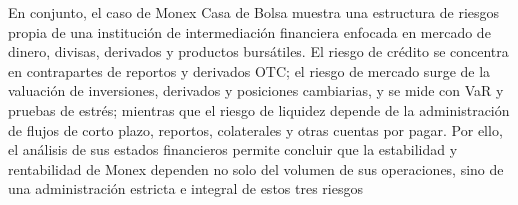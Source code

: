 En conjunto, el caso de Monex Casa de Bolsa muestra una estructura de riesgos propia de una instituci\'on de intermediaci\'on financiera enfocada en mercado de dinero, divisas, derivados y productos burs\'atiles. El riesgo de cr\'edito se concentra en contrapartes de reportos y derivados OTC; el riesgo de mercado surge de la valuaci\'on de inversiones, derivados y posiciones cambiarias, y se mide con VaR y pruebas de estr\'es; mientras que el riesgo de liquidez depende de la administraci\'on de flujos de corto plazo, reportos, colaterales y otras cuentas por pagar. Por ello, el an\'alisis de sus estados financieros permite concluir que la estabilidad y rentabilidad de Monex dependen no solo del volumen de sus operaciones, sino de una administraci\'on estricta e integral de estos tres riesgos